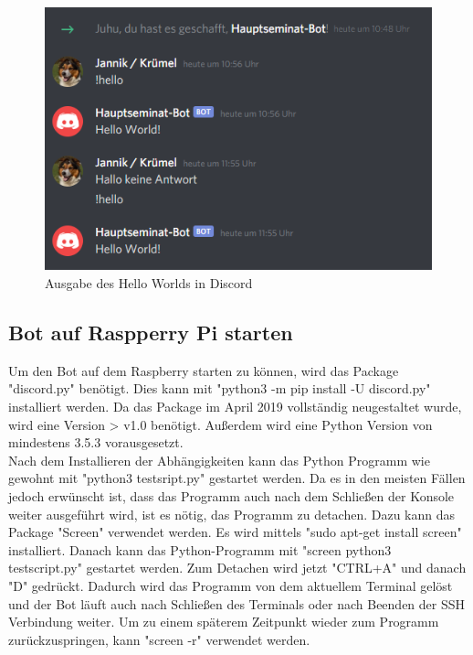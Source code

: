 \documentclass[sigplan,screen]{acmart}
\begin{document}
\begin{figure}[h]
  \centering
  \includegraphics[width=\linewidth]{discord_first}
  \caption{Ausgabe des Hello Worlds in Discord}
\end{figure}
 
\subsection{Bot auf Raspperry Pi starten}

Um den Bot auf dem Raspberry starten zu können, wird das Package "discord.py" benötigt. Dies kann mit "python3 -m pip install -U discord.py" installiert werden. Da das Package im April 2019 vollständig neugestaltet wurde, wird eine Version > v1.0 benötigt. Außerdem wird eine Python Version von mindestens 3.5.3 vorausgesetzt. \\
\noindent Nach dem Installieren der Abhängigkeiten kann das Python Programm wie gewohnt mit "python3 testsript.py" gestartet werden. Da es in den meisten Fällen jedoch erwünscht ist, dass das Programm auch nach dem Schließen der Konsole weiter ausgeführt wird, ist es nötig, das Programm zu detachen. Dazu kann das Package "Screen" verwendet werden. Es wird mittels "sudo apt-get install screen" installiert. Danach kann das Python-Programm mit "screen python3 testscript.py" gestartet werden. Zum Detachen wird jetzt "CTRL+A" und danach "D" gedrückt. Dadurch wird das Programm von dem aktuellem Terminal gelöst und der Bot läuft auch nach Schließen des Terminals oder nach Beenden der SSH Verbindung weiter. Um zu einem späterem Zeitpunkt wieder zum Programm zurückzuspringen, kann "screen -r" verwendet werden. \cite{deta}
\end{document}
